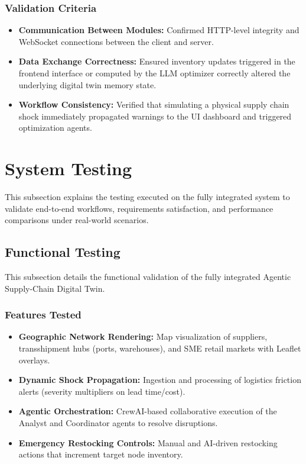 \subsubsection{Validation Criteria}
\begin{itemize}
    \item \textbf{Communication Between Modules:} Confirmed HTTP-level integrity and WebSocket connections between the client and server.
    \item \textbf{Data Exchange Correctness:} Ensured inventory updates triggered in the frontend interface or computed by the LLM optimizer correctly altered the underlying digital twin memory state.
    \item \textbf{Workflow Consistency:} Verified that simulating a physical supply chain shock immediately propagated warnings to the UI dashboard and triggered optimization agents.
\end{itemize}

\section[System Testing]{System Testing}
This subsection explains the testing executed on the fully integrated system to validate end-to-end workflows, requirements satisfaction, and performance comparisons under real-world scenarios.

\subsection[Functional Testing]{Functional Testing}
This subsection details the functional validation of the fully integrated Agentic Supply-Chain Digital Twin.

\subsubsection{Features Tested}
\begin{itemize}
    \item \textbf{Geographic Network Rendering:} Map visualization of suppliers, transshipment hubs (ports, warehouses), and SME retail markets with Leaflet overlays.
    \item \textbf{Dynamic Shock Propagation:} Ingestion and processing of logistics friction alerts (severity multipliers on lead time/cost).
    \item \textbf{Agentic Orchestration:} CrewAI-based collaborative execution of the Analyst and Coordinator agents to resolve disruptions.
    \item \textbf{Emergency Restocking Controls:} Manual and AI-driven restocking actions that increment target node inventory.
\end{itemize}

